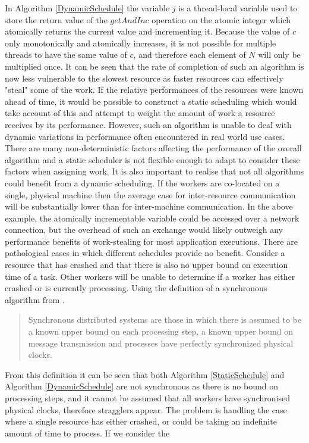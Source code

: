 \documentclass[12pt]{article}
\begin{document}
In Algorithm \ref{DynamicSchedule} the variable $j$ is a thread-local variable used to store the return value of the $getAndInc$ operation on the atomic integer which atomically returns the current value and incrementing it. Because the value of $c$ only monotonically and atomically increases, it is not possible for multiple threads to have the same value of $c$, and therefore each element of $N$ will only be multiplied once. It can be seen that the rate of completion of such an algorithm is now less vulnerable to the slowest resource as faster resources can effectively "steal" some of the work.
\newline
If the relative performances of the resources were known ahead of time, it would be possible to construct a static scheduling which would take account of this and attempt to weight the amount of work a resource receives by its performance. However, such an algorithm is unable to deal with dynamic variations in performance often encountered in real world use cases. There are many non-deterministic factors affecting the performance of the overall algorithm and a static scheduler is not flexible enough to adapt to consider these factors when assigning work.
\newline
It is also important to realise that not all algorithms could benefit from a dynamic scheduling. If the workers are co-located on a single, physical machine then the average case for inter-resource communication will be substantially lower than for inter-machine communication. In the above example, the atomically incrementable variable could be accessed over a network connection, but the overhead of such an exchange would likely outweigh any performance benefits of work-stealing for most application executions.
\newline
There are pathological cases in which different schedules provide no benefit. Consider a resource that has crashed and that there is also no upper bound on execution time of a task. Other workers will be unable to determine if a worker has either crashed or is currently processing.
\newline
Using the definition of a synchronous algorithm from \cite{mageeanalyzing}.

\blockquote{Synchronous distributed systems are those in which there is assumed
to be a known upper bound on each processing step, a known upper bound on
message transmission and processes have perfectly synchronized physical
clocks.}

From this definition it can be seen that both Algorithm \ref{StaticSchedule} and Algorithm \ref{DynamicSchedule} are not synchronous as there is no bound on processing steps, and it cannot be assumed that all workers have synchronised physical clocks, therefore stragglers appear. The problem is handling the case where a single resource has either crashed, or could be taking an indefinite amount of time to process. If we consider the 
\end{document}
